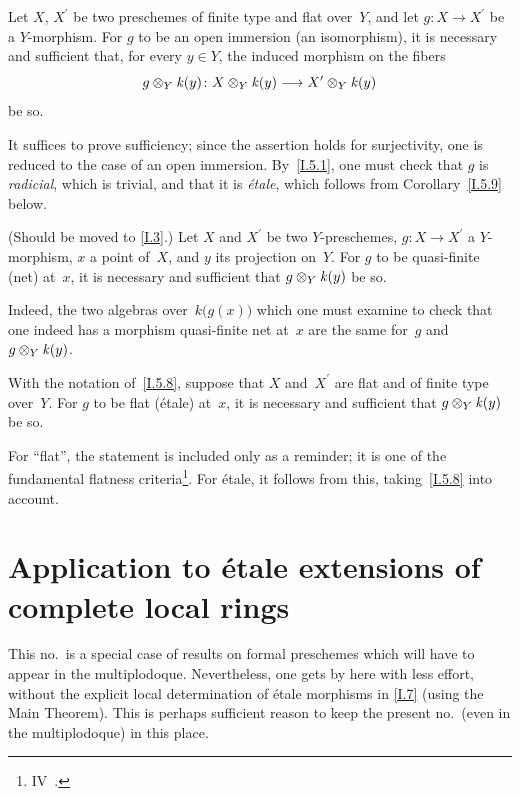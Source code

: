 \begin{proposition}
\label{I.5.7}
Let $X$, $X^\prime$ be two preschemes of finite type and flat
over~$Y$, and let $g\colon X\to X^\prime$ be a $Y$-morphism.
For $g$ to be an open immersion (\resp an isomorphism), it is
necessary and sufficient that, for every $y\in Y$, the induced
morphism on the fibers
\[
g\otimes_Y\kres(y)\colon X\otimes_Y\kres(y)\to X^\prime
\otimes_Y\kres(y)
\]
be so.
\end{proposition}

It suffices to prove sufficiency; since the assertion holds for
surjectivity, one is reduced to the case of an open immersion.
By~\ref{I.5.1}, one must check that $g$ is \emph{radicial},
which is trivial, and that it is \emph{\'etale}, which follows
from Corollary~\ref{I.5.9} below.

\begin{corollary}
\label{I.5.8}
(Should be moved to \No\ref{I.3}.) Let $X$ and $X^\prime$ be
two $Y$-preschemes, $g\colon X\to X^\prime$ a $Y$-morphism,
$x$ a point of~$X$, and $y$ its projection on~$Y$. For $g$ to
be quasi-finite (\resp net) at~$x$, it is necessary and sufficient
that $g\otimes_Y\mathit{k}(y)$ be so.
\end{corollary}

Indeed, the two algebras over~$k\big(g(x)\big)$ which one must
examine to check that one indeed has a morphism quasi-finite
\resp net at~$x$ are the same for~$g$ and $g\otimes_Y\mathit{k}(y)$.

\begin{corollary}
\label{I.5.9}
With
the notation of~\ref{I.5.8}, suppose that $X$ and~$X^\prime$
are flat and of finite type over~$Y$. For $g$ to be flat
(\resp \'etale) at~$x$, it is necessary and sufficient that
$g\otimes_Y\mathit{k}(y)$ be so.
\end{corollary}

For ``flat'', the statement is included only as a reminder;
it is one of the fundamental flatness criteria\footnote{\Cf
IV~.}. For \'etale, it follows from this,
taking~\ref{I.5.8} into account.

\section{Application to \'etale extensions of complete local rings}
\label{I.6}

This no.\ is a special case of results on formal preschemes
which will have to appear in the multiplodoque. Nevertheless,
one gets by here with less effort, \ie without the explicit
local determination of \'etale morphisms in
\No\ref{I.7} (using the Main Theorem). This is perhaps
sufficient reason to keep the present no.\ (even in the
multiplodoque) in this place.

